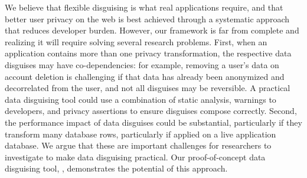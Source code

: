 %
We believe that flexible disguising is what real applications require, and that better user
privacy on the web is best achieved through a systematic approach that reduces developer
burden.
%
However, our framework is far from complete and realizing it will require solving several
research problems.
%
First, when an application contains more than one privacy transformation, the respective
data disguises may have co-dependencies: for example, removing a user's data on account
deletion is challenging if that data has already been anonymized and decorrelated from the
user, and not all disguises may be reversible.
%
A practical data disguising tool could use a combination of static analysis, warnings to
developers, and privacy assertions to ensure disguises compose correctly.
%
Second, the performance impact of data disguises could be substantial, particularly if they
transform many database rows, particularly if applied on a live application database.
%
We argue that these are important challenges for researchers to investigate to make data
disguising practical.
%
Our proof-of-concept data disguising tool, \sys, demonstrates the potential of this
approach.
%
%
%
%
%
%
